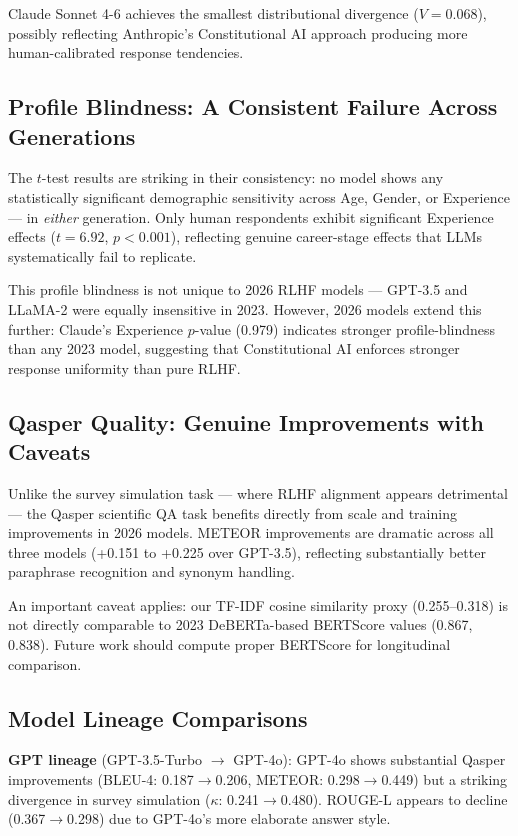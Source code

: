 \documentclass[11pt,a4paper]{article}
\begin{document}
Claude Sonnet 4-6 achieves the smallest distributional divergence ($V = 0.068$),
possibly reflecting Anthropic's Constitutional AI approach producing more
human-calibrated response tendencies.

\subsection{Profile Blindness: A Consistent Failure Across Generations}

The $t$-test results are striking in their consistency: no model shows any
statistically significant demographic sensitivity across Age, Gender, or
Experience --- in \emph{either} generation. Only human respondents exhibit
significant Experience effects ($t = 6.92$, $p < 0.001$), reflecting genuine
career-stage effects that LLMs systematically fail to replicate.

This profile blindness is not unique to 2026 RLHF models --- GPT-3.5 and
LLaMA-2 were equally insensitive in 2023. However, 2026 models extend this
further: Claude's Experience $p$-value (0.979) indicates stronger
profile-blindness than any 2023 model, suggesting that Constitutional AI
enforces stronger response uniformity than pure RLHF.

\subsection{Qasper Quality: Genuine Improvements with Caveats}

Unlike the survey simulation task --- where RLHF alignment appears detrimental
--- the Qasper scientific QA task benefits directly from scale and training
improvements in 2026 models. METEOR improvements are dramatic across all three
models ({+}0.151 to {+}0.225 over GPT-3.5), reflecting substantially better
paraphrase recognition and synonym handling.

An important caveat applies: our TF-IDF cosine similarity proxy (0.255--0.318)
is not directly comparable to 2023 DeBERTa-based BERTScore values (0.867,
0.838). Future work should compute proper BERTScore for longitudinal comparison.

\subsection{Model Lineage Comparisons}

\textbf{GPT lineage} (GPT-3.5-Turbo $\rightarrow$ GPT-4o): GPT-4o shows
substantial Qasper improvements (BLEU-4: 0.187$\rightarrow$0.206, METEOR:
0.298$\rightarrow$0.449) but a striking divergence in survey simulation
($\kappa$: 0.241$\rightarrow$0.480). ROUGE-L appears to decline
(0.367$\rightarrow$0.298) due to GPT-4o's more elaborate answer style.
\end{document}
